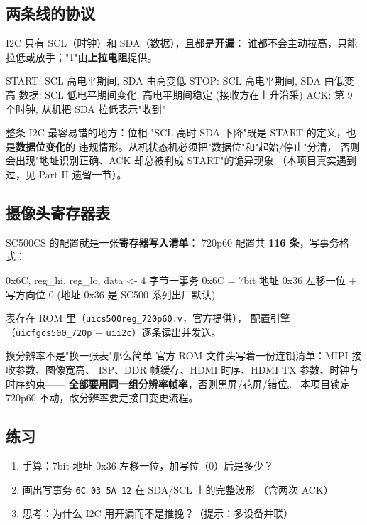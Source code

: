 \documentclass[11pt]{ctexart}
\newcommand{\code}[1]{\texttt{#1}}
\begin{document}
\subsection{两条线的协议}

I2C 只有 SCL（时钟）和 SDA（数据），且都是\textbf{开漏}：
谁都不会主动拉高，只能拉低或放手；"1"由\textbf{上拉电阻}提供。

\begin{Verilog}
START:  SCL 高电平期间, SDA 由高变低
STOP:   SCL 高电平期间, SDA 由低变高
数据:   SCL 低电平期间变化, 高电平期间稳定 (接收方在上升沿采)
ACK:    第 9 个时钟, 从机把 SDA 拉低表示"收到"
\end{Verilog}

\begin{warnbox}{整条 I2C 最容易错的地方：位相}
"SCL 高时 SDA 下降"既是 START 的定义，也是\textbf{数据位变化}的
违规情形。从机状态机必须把"数据位"和"起始/停止"分清，
否则会出现"地址识别正确、ACK 却总被判成 START"的诡异现象
（本项目真实遇到过，见 Part II 遗留一节）。
\end{warnbox}

\subsection{摄像头寄存器表}

SC500CS 的配置就是一张\textbf{寄存器写入清单}：
720p60 配置共 \textbf{116 条}，写事务格式：

\begin{Verilog}
{0x6C, reg_hi, reg_lo, data}      <- 4 字节一事务
0x6C = 7bit 地址 0x36 左移一位 + 写方向位 0
(地址 0x36 是 SC500 系列出厂默认)
\end{Verilog}

表存在 ROM 里（\code{uics500reg\_720p60.v}，官方提供），
配置引擎（\code{uicfgcs500\_720p} + \code{uii2c}）逐条读出并发送。

\begin{keybox}{换分辨率不是"换一张表"那么简单}
官方 ROM 文件头写着一份连锁清单：MIPI 接收参数、图像宽高、
ISP、DDR 帧缓存、HDMI 时序、HDMI TX 参数、时钟与时序约束——
\textbf{全部要用同一组分辨率帧率}，否则黑屏/花屏/错位。
本项目锁定 720p60 不动，改分辨率要走接口变更流程。
\end{keybox}

\subsection{练习}

\begin{enumerate}
  \item 手算：7bit 地址 0x36 左移一位，加写位（0）后是多少？
  \item 画出写事务 \code{6C 03 5A 12} 在 SDA/SCL 上的完整波形
    （含两次 ACK）
  \item 思考：为什么 I2C 用开漏而不是推挽？（提示：多设备并联）
\end{enumerate}
\end{document}
